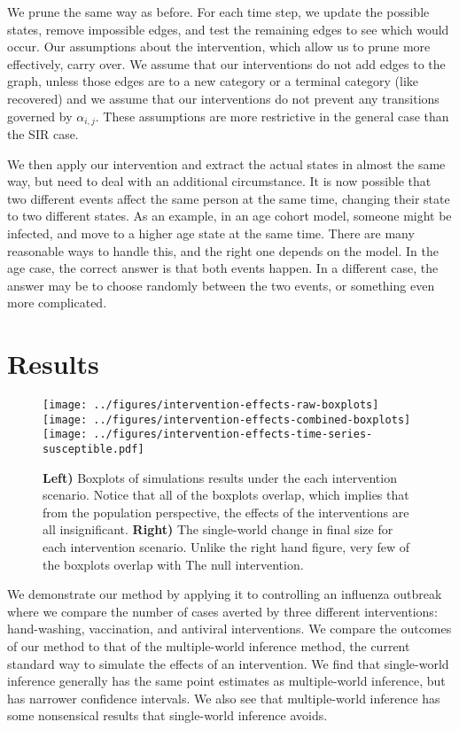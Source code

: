 \documentclass[openacc]{rsproca_new}%
\begin{document}
We prune the same way as before.
For each time step, we update the possible states, remove impossible edges, and test the remaining edges to see which would occur.
Our assumptions about the intervention, which allow us to prune more effectively, carry over.
We assume that our interventions do not add edges to the graph, unless those edges are to a new category or a terminal category (like recovered) and we assume that our interventions do not prevent any transitions governed by $\alpha_{i,j}$.
These assumptions are more restrictive in the general case than the SIR case.

We then apply our intervention and extract the actual states in almost the same way, but need to deal with an additional circumstance.
It is now possible that two different events affect the same person at the same time, changing their state to two different states.
As an example, in an age cohort model, someone might be infected, and move to a higher age state at the same time.
There are many reasonable ways to handle this, and the right one depends on the model.
In the age case, the correct answer is that both events happen.
In a different case, the answer may be to choose randomly between the two events, or something even more complicated.

\section{Results}

\begin{figure}\label{fig:epicurve}
\centering
\texttt{[image: ../figures/intervention-effects-raw-boxplots]}
\texttt{[image: ../figures/intervention-effects-combined-boxplots]}
\texttt{[image: ../figures/intervention-effects-time-series-susceptible.pdf]}
\caption{\textbf{Left)} Boxplots of simulations results under the each intervention scenario.  Notice that all of the boxplots overlap, which implies that from the population perspective, the effects of the interventions are all insignificant.  \textbf{Right)} The single-world change in final size for each intervention scenario.  Unlike the right hand figure, very few of the boxplots overlap with The null intervention.}
\end{figure}

We demonstrate our method by applying it to controlling an influenza outbreak where we compare the number of cases averted by three different interventions: hand-washing, vaccination, and antiviral interventions.
We compare the outcomes of our method to that of the multiple-world inference method, the current standard way to simulate the effects of an intervention.
We find that single-world inference generally has the same point estimates as multiple-world inference, but has narrower confidence intervals.
We also see that multiple-world inference has some nonsensical results that single-world inference avoids.
\end{document}
